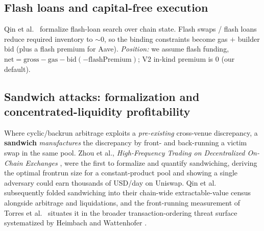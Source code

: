 \documentclass[11pt]{article}
\begin{document}
\subsection{Flash loans and capital-free execution}
Qin et al.\ \cite{qin2021flashloans} formalize flash-loan search over chain state.
Flash swaps / flash loans reduce required inventory to $\sim$0, so the binding
constraints become gas $+$ builder bid (plus a flash premium for Aave).
\emph{Position:} we assume flash funding, $\text{net} = \text{gross} - \text{gas} -
\text{bid} (- \text{flashPremium})$; V2 in-kind premium is $0$ (our default).

\subsection{Sandwich attacks: formalization and concentrated-liquidity profitability}
Where cyclic/backrun arbitrage exploits a \emph{pre-existing} cross-venue
discrepancy, a \textbf{sandwich} \emph{manufactures} the discrepancy by front- and
back-running a victim swap in the same pool. Zhou et al., \emph{High-Frequency
Trading on Decentralized On-Chain Exchanges} \cite{zhou2021hft}, were the first to
formalize and quantify sandwiching, deriving the optimal frontrun size for a
constant-product pool and showing a single adversary could earn thousands of USD/day
on Uniswap. Qin et al.\ \cite{qin2022quantifying} subsequently folded sandwiching
into their chain-wide extractable-value census alongside arbitrage and liquidations,
and the front-running measurement of Torres et al.\ \cite{torres2021frontrunner}
situates it in the broader transaction-ordering threat surface systematized by
Heimbach and Wattenhofer \cite{heimbach2022sok}.
\end{document}
